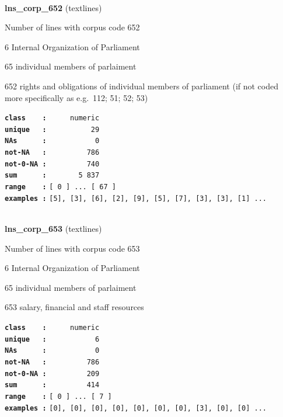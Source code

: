 \documentclass[]{article}
\begin{document}
~

\textbf{lns\_corp\_652} (textlines)

Number of lines with corpus code 652

6 Internal Organization of Parliament

65 individual members of parlaiment

652 rights and obligations of individual members of parliament (if not
coded more specifically as e.g.~112; 51; 52; 53)

\textbf{\texttt{class\ \ \ \ :}} \texttt{~~~~~numeric}\\
\textbf{\texttt{unique\ \ \ :}} \texttt{~~~~~~~~~~29}\\
\textbf{\texttt{NAs\ \ \ \ \ \ :}} \texttt{~~~~~~~~~~~0}\\
\textbf{\texttt{not-NA\ \ \ :}} \texttt{~~~~~~~~~786}\\
\textbf{\texttt{not-0-NA\ :}} \texttt{~~~~~~~~~740}\\
\textbf{\texttt{sum\ \ \ \ \ \ :}} \texttt{~~~~~~~5~837}\\
\textbf{\texttt{range\ \ \ \ :}}
\texttt{{[}\ 0\ {]}\ ...\ {[}\ 67\ {]}}\\
\textbf{\texttt{examples\ :}}
\texttt{{[}5{]},\ {[}3{]},\ {[}6{]},\ {[}2{]},\ {[}9{]},\ {[}5{]},\ {[}7{]},\ {[}3{]},\ {[}3{]},\ {[}1{]}\ ...}\\

~

\textbf{lns\_corp\_653} (textlines)

Number of lines with corpus code 653

6 Internal Organization of Parliament

65 individual members of parlaiment

653 salary, financial and staff resources

\textbf{\texttt{class\ \ \ \ :}} \texttt{~~~~~numeric}\\
\textbf{\texttt{unique\ \ \ :}} \texttt{~~~~~~~~~~~6}\\
\textbf{\texttt{NAs\ \ \ \ \ \ :}} \texttt{~~~~~~~~~~~0}\\
\textbf{\texttt{not-NA\ \ \ :}} \texttt{~~~~~~~~~786}\\
\textbf{\texttt{not-0-NA\ :}} \texttt{~~~~~~~~~209}\\
\textbf{\texttt{sum\ \ \ \ \ \ :}} \texttt{~~~~~~~~~414}\\
\textbf{\texttt{range\ \ \ \ :}}
\texttt{{[}\ 0\ {]}\ ...\ {[}\ 7\ {]}}\\
\textbf{\texttt{examples\ :}}
\texttt{{[}0{]},\ {[}0{]},\ {[}0{]},\ {[}0{]},\ {[}0{]},\ {[}0{]},\ {[}0{]},\ {[}3{]},\ {[}0{]},\ {[}0{]}\ ...}\\
\end{document}
